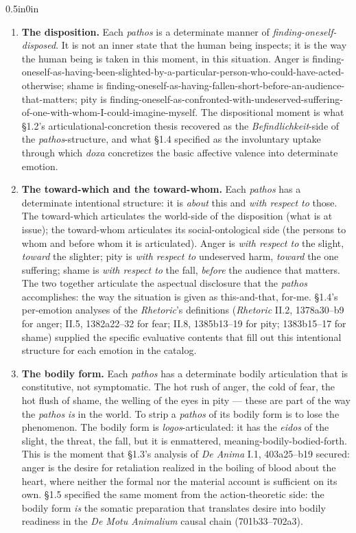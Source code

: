 \begin{adjustwidth}{0.5in}{0in}
\begin{enumerate}
\item \textbf{The disposition.} Each \textit{pathos} is a determinate manner of \textit{finding-oneself-disposed}. It is not an inner state that the human being inspects; it is the way the human being is taken in this moment, in this situation. Anger is finding-oneself-as-having-been-slighted-by-a-particular-person-who-could-have-acted-otherwise; shame is finding-oneself-as-having-fallen-short-before-an-audience-that-matters; pity is finding-oneself-as-confronted-with-undeserved-suffering-of-one-with-whom-I-could-imagine-myself. The dispositional moment is what \S1.2's articulational-concretion thesis recovered as the \textit{Befindlichkeit}-side of the \textit{pathos}-structure, and what \S1.4 specified as the involuntary uptake through which \textit{doxa} concretizes the basic affective valence into determinate emotion.

\item \textbf{The toward-which and the toward-whom.} Each \textit{pathos} has a determinate intentional structure: it is \textit{about} this and \textit{with respect to} those. The toward-which articulates the world-side of the disposition (what is at issue); the toward-whom articulates its social-ontological side (the persons to whom and before whom it is articulated). Anger is \textit{with respect to} the slight, \textit{toward} the slighter; pity is \textit{with respect to} undeserved harm, \textit{toward} the one suffering; shame is \textit{with respect to} the fall, \textit{before} the audience that matters. The two together articulate the aspectual disclosure that the \textit{pathos} accomplishes: the way the situation is given as this-and-that, for-me. \S1.4's per-emotion analyses of the \textit{Rhetoric}'s definitions (\textit{Rhetoric} II.2, 1378a30--b9 for anger; II.5, 1382a22--32 for fear; II.8, 1385b13--19 for pity; 1383b15--17 for shame) supplied the specific evaluative contents that fill out this intentional structure for each emotion in the catalog.

\item \textbf{The bodily form.} Each \textit{pathos} has a determinate bodily articulation that is constitutive, not symptomatic. The hot rush of anger, the cold of fear, the hot flush of shame, the welling of the eyes in pity --- these are part of the way the \textit{pathos} \textit{is} in the world. To strip a \textit{pathos} of its bodily form is to lose the phenomenon. The bodily form is \textit{logos}-articulated: it has the \textit{eidos} of the slight, the threat, the fall, but it is enmattered, meaning-bodily-bodied-forth. This is the moment that \S1.3's analysis of \textit{De Anima} I.1, 403a25--b19 secured: anger is the desire for retaliation realized in the boiling of blood about the heart, where neither the formal nor the material account is sufficient on its own. \S1.5 specified the same moment from the action-theoretic side: the bodily form \textit{is} the somatic preparation that translates desire into bodily readiness in the \textit{De Motu Animalium} causal chain (701b33--702a3).


\end{enumerate}
\end{adjustwidth}
